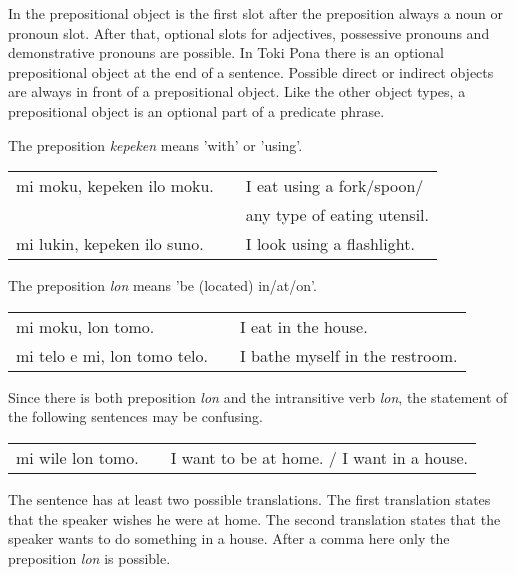 In the prepositional object is the first slot after the preposition always a noun or pronoun slot.
After that, optional slots for adjectives, possessive pronouns and demonstrative pronouns are possible.
In Toki Pona there is an optional prepositional object at the end of a sentence.
Possible direct or indirect objects are always in front of a prepositional object.
Like the other object types, a prepositional object is an optional part of a predicate phrase.


The preposition \textit{kepeken} means 'with' or 'using'.

\begin{supertabular}{p{5,5cm}|ll}
    mi moku, kepeken ilo moku.  &  & I eat using a fork/spoon/  \\ && any type of eating utensil. \\
    mi lukin, kepeken ilo suno. &  & I look using a flashlight. \\
\end{supertabular}

%
%
The preposition \textit{lon} means 'be (located) in/at/on'.

\begin{supertabular}{p{5,5cm}|ll}
    mi moku, lon tomo.           &  & I eat in the house.             \\
    mi telo e mi, lon tomo telo. &  & I bathe myself in the restroom. \\
\end{supertabular}

Since there is both preposition \textit{lon} and the intransitive verb \textit{lon}, the statement of the following sentences may be confusing.

\begin{supertabular}{p{5,5cm}|ll}
    mi wile lon tomo. &  & I want to be at home. / I want in a house. \\
\end{supertabular}

%
The sentence has at least two possible translations.
The first translation states that the speaker wishes he were at home.
The second translation states that the speaker wants to do something in a house.
After a comma here only the preposition \textit{lon} is possible.

